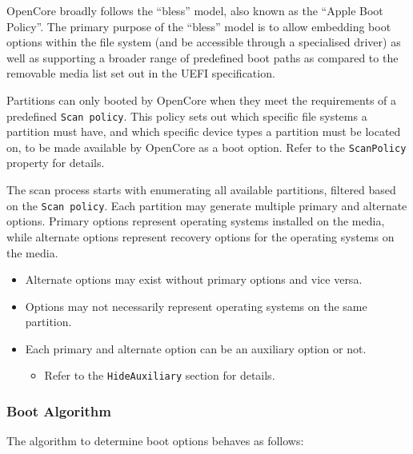 \documentclass[]{article}
\providecommand{\tightlist}{%
  \setlength{\itemsep}{0pt}\setlength{\parskip}{0pt}}
\begin{document}
OpenCore broadly follows the ``bless'' model, also known as the ``Apple Boot Policy''. The primary purpose of
the ``bless'' model is to allow embedding boot options within the file system (and be accessible through a
specialised driver) as well as supporting a broader range of predefined boot paths as compared to the
removable media list set out in the UEFI specification.

Partitions can only booted by OpenCore when they meet the requirements of a predefined \texttt{Scan policy}.
This policy sets out which specific file systems a partition must have, and which specific device types
a partition must be located on, to be made available by OpenCore as a boot option.
Refer to the \texttt{ScanPolicy} property for details.

The scan process starts with enumerating all available partitions, filtered based on the \texttt{Scan policy}.
Each partition may generate multiple primary and alternate options. Primary options represent operating systems
installed on the media, while alternate options represent recovery options for the operating systems on the media.
\begin{itemize}
\tightlist
\item Alternate options may exist without primary options and vice versa.
\item Options may not necessarily represent operating systems on the same partition.
\item Each primary and alternate option can be an auxiliary option or not.
\begin{itemize}
\tightlist
  \item Refer to the \texttt{HideAuxiliary} section for details.
\end{itemize} \medskip
\end{itemize}

\subsubsection{Boot Algorithm}\label{bootalgorithm}

The algorithm to determine boot options behaves as follows:
\end{document}
